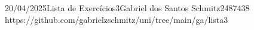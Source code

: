 \documentclass{article}
\begin{document}
{20/04/2025}{Lista de Exercícios}{3}{Gabriel dos Santos Schmitz}{2487438}
{https://github.com/gabrielzschmitz/uni/tree/main/ga/lista3}





\newpage
\printbibliography\
\end{document}
